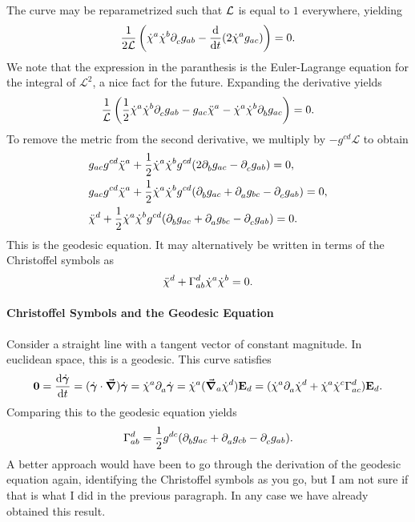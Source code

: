 The curve may be reparametrized such that $\mathcal{L}$ is equal to $1$ everywhere, yielding
\begin{align*}
	\frac{1}{2\mathcal{L}}\left(\dot{\chi}^{a}\dot{\chi}^{b}\partial^{}_{c}g_{ab} - \dv{t}(2\dot{\chi}^{a}g_{ac})\right) = 0.
\end{align*}
We note that the expression in the paranthesis is the Euler-Lagrange equation for the integral of $\mathcal{L}^{2}$, a nice fact for the future. Expanding the derivative yields
\begin{align*}
	\frac{1}{\mathcal{L}}\left(\frac{1}{2}\dot{\chi}^{a}\dot{\chi}^{b}\partial^{}_{c}g_{ab} - g_{ac}\ddot{\chi}^{a} - \dot{\chi}^{a}\dot{\chi}^{b}\partial^{}_{b}g_{ac}\right) = 0.
\end{align*}
To remove the metric from the second derivative, we multiply by $-g^{cd}\mathcal{L}$ to obtain
\begin{align*}
	&g_{ac}g^{cd}\ddot{\chi}^{a} + \frac{1}{2}\dot{\chi}^{a}\dot{\chi}^{b}g^{cd}(2\partial^{}_{b}g_{ac} - \partial^{}_{c}g_{ab}) = 0, \\
	&g_{ac}g^{cd}\ddot{\chi}^{a} + \frac{1}{2}\dot{\chi}^{a}\dot{\chi}^{b}g^{cd}(\partial^{}_{b}g_{ac} + \partial^{}_{a}g_{bc} - \partial^{}_{c}g_{ab}) = 0, \\
	&\ddot{\chi}^{d} + \frac{1}{2}\dot{\chi}^{a}\dot{\chi}^{b}g^{cd}(\partial^{}_{b}g_{ac} + \partial^{}_{a}g_{bc} - \partial^{}_{c}g_{ab}) = 0.
\end{align*}
This is the geodesic equation. It may alternatively be written in terms of the Christoffel symbols as
\begin{align*}
	\ddot{\chi}^{d} + \chris{d}{a}{b}\dot{\chi}^{a}\dot{\chi}^{b} = 0.
\end{align*}

\paragraph{Christoffel Symbols and the Geodesic Equation}
Consider a straight line with a tangent vector of constant magnitude. In euclidean space, this is a geodesic. This curve satisfies
\begin{align*}
	\vb{0} = \dv{\dot{\vb*{\gamma}}}{t} = (\dot{\vb*{\gamma}}\cdot\grad)\dot{\vb*{\gamma}} = \dot{\chi}^{a}\del{a}{\dot{\vb*{\gamma}}} = \dot{\chi}^{a}(\dcov{a}{\dot{\chi}^{d}})\tb{d} = (\dot{\chi}^{a}\del{a}{\dot{\chi}^{d}} + \dot{\chi}^{a}\dot{\chi}^{c}\chris{d}{a}{c})\tb{d}.
\end{align*}
Comparing this to the geodesic equation yields
\begin{align*}
	\chris{d}{a}{b} = \frac{1}{2}g^{dc}(\del{b}{g_{ac}} + \del{a}{g_{cb}} - \del{c}{g_{ab}}).
\end{align*}
A better approach would have been to go through the derivation of the geodesic equation again, identifying the Christoffel symbols as you go, but I am not sure if that is what I did in the previous paragraph. In any case we have already obtained this result.

